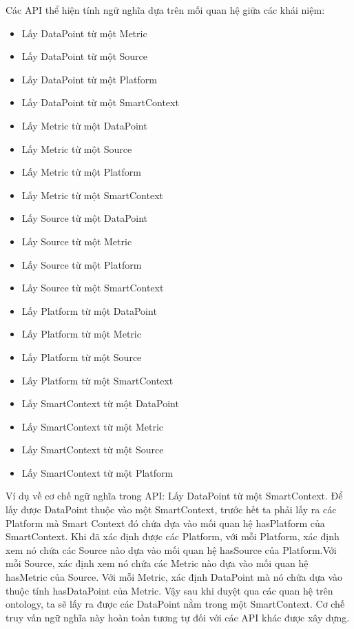 Các API thể hiện tính ngữ nghĩa dựa trên mối quan hệ giữa các khái niệm:
\begin{itemize}
	\item Lấy DataPoint từ một Metric
	\item Lấy DataPoint từ một Source
	\item Lấy DataPoint từ một Platform
	\item Lấy DataPoint từ một SmartContext
	\item Lấy Metric từ một DataPoint
	\item Lấy Metric từ một Source
	\item Lấy Metric từ một Platform
	\item Lấy Metric từ một SmartContext
	\item Lấy Source từ một DataPoint
	\item Lấy Source từ một Metric
	\item Lấy Source từ một Platform
	\item Lấy Source từ một SmartContext
	\item Lấy Platform từ một DataPoint
	\item Lấy Platform từ một Metric
	\item Lấy Platform từ một Source
	\item Lấy Platform từ một SmartContext
	\item Lấy SmartContext từ một DataPoint
	\item Lấy SmartContext từ một Metric
	\item Lấy SmartContext từ một Source
	\item Lấy SmartContext từ một Platform
\end{itemize}


Ví dụ về cơ chế ngữ nghĩa trong API: Lấy DataPoint từ một SmartContext.
Để lấy được DataPoint thuộc vào một SmartContext, trước hết ta phải lấy ra các Platform mà Smart Context đó chứa dựa vào mối quan hệ hasPlatform của SmartContext. Khi đã xác định được các Platform, với mỗi Platform, xác định xem nó chứa các Source nào dựa vào mối quan hệ hasSource của Platform.Với mỗi Source, xác định xem nó chứa các Metric nào dựa vào mối quan hệ hasMetric của Source. Với mỗi Metric, xác định DataPoint mà nó chứa dựa vào thuộc tính hasDataPoint của Metric. Vậy sau khi duyệt qua các quan hệ trên ontology, ta sẽ lấy ra được các DataPoint nằm trong một SmartContext. Cơ chế truy vấn ngữ nghĩa này hoàn toàn tương tự đối với các API khác được xây dựng.